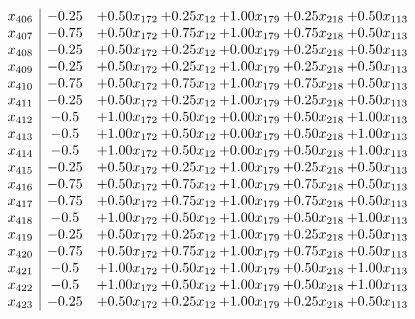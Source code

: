 \documentclass[8pt]{article}
\begin{document}
\[\begin{array}{c| c c@{\hskip 2pt} c@{\hskip 2pt} c@{\hskip 2pt} c@{\hskip 2pt} c@{\hskip 2pt} }
 x_{406}   &  -0.25 & +  0.50 x_{172} & +  0.25 x_{12} & +  1.00 x_{179} & +  0.25 x_{218} & +  0.50 x_{113}\\
 x_{407}   &  -0.75 & +  0.50 x_{172} & +  0.75 x_{12} & +  1.00 x_{179} & +  0.75 x_{218} & +  0.50 x_{113}\\
 x_{408}   &  -0.25 & +  0.50 x_{172} & +  0.25 x_{12} & +  0.00 x_{179} & +  0.25 x_{218} & +  0.50 x_{113}\\
 x_{409}   &  -0.25 & +  0.50 x_{172} & +  0.25 x_{12} & +  1.00 x_{179} & +  0.25 x_{218} & +  0.50 x_{113}\\
 x_{410}   &  -0.75 & +  0.50 x_{172} & +  0.75 x_{12} & +  1.00 x_{179} & +  0.75 x_{218} & +  0.50 x_{113}\\
 x_{411}   &  -0.25 & +  0.50 x_{172} & +  0.25 x_{12} & +  1.00 x_{179} & +  0.25 x_{218} & +  0.50 x_{113}\\
 x_{412}   &  -0.5 & +  1.00 x_{172} & +  0.50 x_{12} & +  0.00 x_{179} & +  0.50 x_{218} & +  1.00 x_{113}\\
 x_{413}   &  -0.5 & +  1.00 x_{172} & +  0.50 x_{12} & +  0.00 x_{179} & +  0.50 x_{218} & +  1.00 x_{113}\\
 x_{414}   &  -0.5 & +  1.00 x_{172} & +  0.50 x_{12} & +  0.00 x_{179} & +  0.50 x_{218} & +  1.00 x_{113}\\
 x_{415}   &  -0.25 & +  0.50 x_{172} & +  0.25 x_{12} & +  1.00 x_{179} & +  0.25 x_{218} & +  0.50 x_{113}\\
 x_{416}   &  -0.75 & +  0.50 x_{172} & +  0.75 x_{12} & +  1.00 x_{179} & +  0.75 x_{218} & +  0.50 x_{113}\\
 x_{417}   &  -0.75 & +  0.50 x_{172} & +  0.75 x_{12} & +  1.00 x_{179} & +  0.75 x_{218} & +  0.50 x_{113}\\
 x_{418}   &  -0.5 & +  1.00 x_{172} & +  0.50 x_{12} & +  1.00 x_{179} & +  0.50 x_{218} & +  1.00 x_{113}\\
 x_{419}   &  -0.25 & +  0.50 x_{172} & +  0.25 x_{12} & +  1.00 x_{179} & +  0.25 x_{218} & +  0.50 x_{113}\\
 x_{420}   &  -0.75 & +  0.50 x_{172} & +  0.75 x_{12} & +  1.00 x_{179} & +  0.75 x_{218} & +  0.50 x_{113}\\
 x_{421}   &  -0.5 & +  1.00 x_{172} & +  0.50 x_{12} & +  1.00 x_{179} & +  0.50 x_{218} & +  1.00 x_{113}\\
 x_{422}   &  -0.5 & +  1.00 x_{172} & +  0.50 x_{12} & +  1.00 x_{179} & +  0.50 x_{218} & +  1.00 x_{113}\\
 x_{423}   &  -0.25 & +  0.50 x_{172} & +  0.25 x_{12} & +  1.00 x_{179} & +  0.25 x_{218} & +  0.50 x_{113}\\

\end{array}\]
\end{document}
